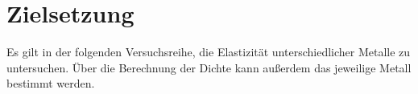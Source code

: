 \section{Zielsetzung}
\label{sec:Zielsetzung}

Es gilt in der folgenden Versuchsreihe, die Elastizität unterschiedlicher Metalle zu untersuchen.
Über die Berechnung der Dichte kann außerdem das jeweilige Metall bestimmt werden.